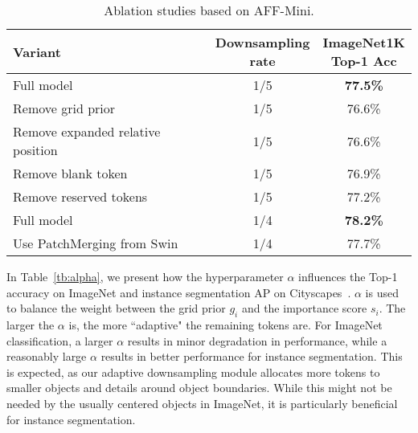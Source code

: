 \documentclass[10pt,twocolumn,letterpaper]{article}
\begin{document}
\begin{table}
\begin{center}
\begin{footnotesize}
\begin{tabular}{lcc}
Variant & \makecell{Downsampling\\rate} & \makecell{ImageNet1K\\Top-1 Acc}
\\\hline
Full model & 1/5 & \textbf{77.5\%}\\
Remove grid prior & 1/5 & 76.6\%\\
Remove expanded relative position & 1/5 & 76.6\%\\
Remove blank token & 1/5 & 76.9\%\\
Remove reserved tokens & 1/5 & 77.2\%\\
\hline
Full model & 1/4 & \textbf{78.2\%}\\
Use PatchMerging from Swin~\cite{swin} & 1/4 & 77.7\%\\
\hline 
\end{tabular}
\end{footnotesize}
\end{center}
\vspace{-0.6cm}
\caption{Ablation studies based on AFF-Mini. 
}
\vskip -0.2in
\label{tb:ablation}
\end{table}


In Table~\ref{tb:alpha}, we present how the hyperparameter $\alpha$ influences the Top-1 accuracy on ImageNet and instance segmentation AP on Cityscapes~\cite{cityscapes}. 
$\alpha$ is used to balance the weight between the grid prior $g_i$ and the importance score $s_i$. The larger the $\alpha$ is, the more ``adaptive" the remaining tokens are. 
For ImageNet classification, a larger $\alpha$ results in minor degradation in performance, while a reasonably large $\alpha$ results in better performance for instance segmentation. This is expected, as our adaptive downsampling module allocates more tokens to smaller objects and details around object boundaries. While this might not be needed by the usually centered objects in ImageNet, it is particularly beneficial for instance segmentation. 
\end{document}
